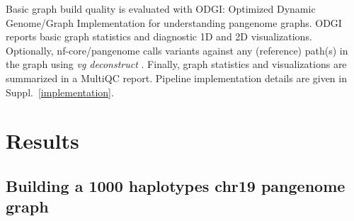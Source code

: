 \documentclass{bioinfo}
\theoremstyle{definition}
\begin{document}
	Basic graph build quality is evaluated with ODGI: Optimized Dynamic Genome/Graph Implementation \citep{Guarracino2022} for understanding pangenome graphs. ODGI reports basic graph statistics and diagnostic 1D and 2D visualizations. 
	Optionally, nf-core/pangenome calls variants against any (reference) path(s) in the graph using \textit{vg deconstruct} \citep{Garrison:2018}. 
	Finally, graph statistics and visualizations are summarized in a MultiQC \citep{Ewels_2016} report. Pipeline implementation details are given in Suppl.~\ref{implementation}.
	\vspace{-0.6cm}
	\section{Results}
	
	
	\subsection{Building a 1000 haplotypes chr19 pangenome graph}
	
\end{document}
